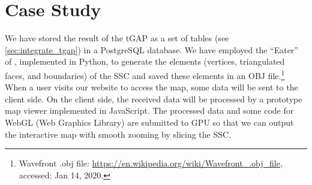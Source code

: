 \documentclass[]{interact}
\begin{document}
%
%
%
%
%
%
%
%


\section{Case Study}
\label{sec:case_study}

We have stored the result of the tGAP 
as a set of tables (see \sect\ref{sec:integrate_tgap}) 
in a PostgreSQL database.
We have employed the ``Eater'' of \citet{Suba2014Merge},
implemented in Python, 
to generate the elements
(vertices, triangulated faces, and boundaries)
of the SSC \citep{vanOosterom2014tGAPSSC} 
and saved these elements in an OBJ file.\footnote{%
Wavefront .obj file:
\url{https://en.wikipedia.org/wiki/Wavefront_.obj_file},
accessed: Jan 14, 2020.}
%
When a user visits our website to access the map,
some data will be sent to the client side.  
On the client side,
the received data will be processed
by a prototype map viewer implemented in JavaScript.
The processed data and some code for WebGL (Web Graphics Library)
are submitted to GPU so that we can output the interactive map with smooth zooming
by slicing the SSC.
\end{document}
